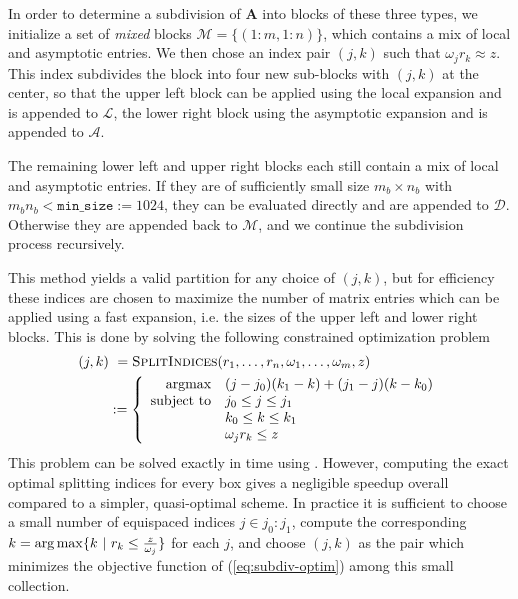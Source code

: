 In order to determine a subdivision of $\bm{A}$ into blocks of these three
types, we initialize a set of \textit{mixed} blocks $\mathscr{M} = \{(1:m,
1:n)\}$, which contains a mix of local and asymptotic entries. We then chose an
index pair $(j,k)$ such that $\omega_j r_k \approx z$. This index subdivides the
block into four new sub-blocks with $(j,k)$ at the center, so that the upper
left block can be applied using the local expansion and is appended to
$\mathscr{L}$, the lower right block using the asymptotic expansion and is
appended to $\mathscr{A}$. 

The remaining lower left and upper right blocks each still contain a mix of
local and asymptotic entries. If they are of sufficiently small size $m_b \times
n_b$ with $m_b n_b < \texttt{min\_size} := 1024$, they can be evaluated directly
and are appended to $\mathscr{D}$. Otherwise they are appended back to
$\mathscr{M}$, and we continue the subdivision process recursively. 

This method yields a valid partition for any choice of $(j,k)$, but for
efficiency these indices are chosen to maximize the number of matrix entries
which can be applied using a fast expansion, i.e. the sizes of the upper left
and lower right blocks. This is done by solving the following constrained
optimization problem
\begin{align}
    (j,k) 
    &\ = \textsc{SplitIndices}(r_1,\dots,r_n, \omega_1,\dots,\omega_m, z) \\
    &:= \left\{
        \begin{array}{r@{\quad } l}
        \text{argmax} & (j-j_0)(k_1-k) + (j_1-j)(k-k_0)   \\
        \text{subject to} & j_0 \leq j \leq j_1 \\ 
        & k_0 \leq k \leq k_1 \\ 
        & \omega_j r_k \leq z
        \end{array}
    \right. \label{eq:subdiv-optim}
\end{align}
This problem can be solved exactly in  time
using . However, computing the exact optimal splitting indices
for every box gives a negligible speedup overall compared to a simpler,
quasi-optimal scheme. In practice it is sufficient to choose a small number of
equispaced indices $j \in j_0:j_1$, compute the corresponding $k = \operatorname*{arg\,max} \{k \
| \ r_k \leq \frac{z}{\omega_j}\}$ for each $j$, and choose $(j,k)$ as the pair
which minimizes the objective function of (\ref{eq:subdiv-optim}) among this
small collection.


